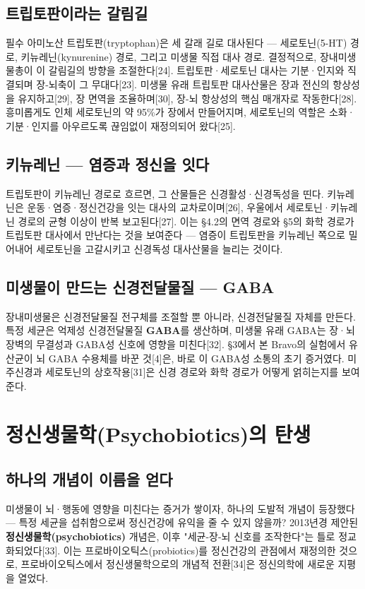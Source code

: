 \documentclass[11pt,oneside]{book}
\begin{document}
\subsection{트립토판이라는 갈림길}
필수 아미노산 트립토판(tryptophan)은 세 갈래 길로 대사된다 — 세로토닌(5-HT) 경로, 키뉴레닌(kynurenine) 경로, 그리고 미생물 직접 대사 경로. 결정적으로, 장내미생물총이 이 갈림길의 방향을 조절한다[24]. 트립토판·세로토닌 대사는 기분·인지와 직결되며 장-뇌축이 그 무대다[23]. 미생물 유래 트립토판 대사산물은 장과 전신의 항상성을 유지하고[29], 장 면역을 조율하며[30], 장-뇌 항상성의 핵심 매개자로 작동한다[28]. 흥미롭게도 인체 세로토닌의 약 95\%가 장에서 만들어지며, 세로토닌의 역할은 소화·기분·인지를 아우르도록 끊임없이 재정의되어 왔다[25].

\subsection{키뉴레닌 — 염증과 정신을 잇다}
트립토판이 키뉴레닌 경로로 흐르면, 그 산물들은 신경활성·신경독성을 띤다. 키뉴레닌은 운동·염증·정신건강을 잇는 대사의 교차로이며[26], 우울에서 세로토닌·키뉴레닌 경로의 균형 이상이 반복 보고된다[27]. 이는 §4.2의 면역 경로와 §5의 화학 경로가 트립토판 대사에서 만난다는 것을 보여준다 — 염증이 트립토판을 키뉴레닌 쪽으로 밀어내어 세로토닌을 고갈시키고 신경독성 대사산물을 늘리는 것이다.

\subsection{미생물이 만드는 신경전달물질 — GABA}
장내미생물은 신경전달물질 전구체를 조절할 뿐 아니라, 신경전달물질 자체를 만든다. 특정 세균은 억제성 신경전달물질 \textbf{GABA}를 생산하며, 미생물 유래 GABA는 장·뇌 장벽의 무결성과 GABA성 신호에 영향을 미친다[32]. §3에서 본 Bravo의 실험에서 유산균이 뇌 GABA 수용체를 바꾼 것[4]은, 바로 이 GABA성 소통의 초기 증거였다. 미주신경과 세로토닌의 상호작용[31]은 신경 경로와 화학 경로가 어떻게 얽히는지를 보여준다.

\section{정신생물학(Psychobiotics)의 탄생}
\subsection{하나의 개념이 이름을 얻다}
미생물이 뇌·행동에 영향을 미친다는 증거가 쌓이자, 하나의 도발적 개념이 등장했다 — 특정 세균을 섭취함으로써 정신건강에 유익을 줄 수 있지 않을까? 2013년경 제안된 \textbf{정신생물학(psychobiotics)} 개념은, 이후 "세균-장-뇌 신호를 조작한다"는 틀로 정교화되었다[33]. 이는 프로바이오틱스(probiotics)를 정신건강의 관점에서 재정의한 것으로, 프로바이오틱스에서 정신생물학으로의 개념적 전환[34]은 정신의학에 새로운 지평을 열었다.
\end{document}
